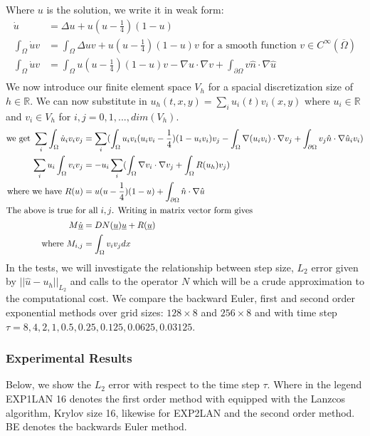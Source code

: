 Where $u$ is the solution, we write it in weak form:
\begin{align*}
    \dot u&=\Delta u+u(u-\frac14)(1-u)\\
    \int_{\Omega} \dot u v &=\int_{\Omega} \Delta uv+u(u-\frac14)(1-u)v \text{ for a smooth function $v \in C^{\infty}(\overline{\Omega})$}\\
    \int_{\Omega} \dot u v &=\int_{\Omega} u(u-\frac14)(1-u)v - \nabla u \cdot \nabla v + \int_{\partial\Omega}  v\hat n \cdot \nabla \hat u\\
\end{align*}
We now introduce our finite element space $V_h$ for a spacial discretization size of $h \in \mathbb{R}$.
We can now substitute in $u_h(t,x,y) = \sum_i u_i(t) v_i(x,y)$ where $u_i \in \mathbb{R}$ and $v_i \in V_h$ for $i,j = 0,1,...,dim(V_h)$.
\begin{align*}
    \text{we get } \sum_i\int_{\Omega} \dot u_i v_i v_j &=\sum_i(\int_{\Omega} u_iv_i(u_iv_i-\frac14)(1-u_iv_i)v_j - \int_{\Omega}\nabla (u_iv_i) \cdot \nabla v_j + \int_{\partial\Omega}  v_j\hat n \cdot \nabla \hat u_iv_i)\\
    \sum_iu_i\int_{\Omega}v_iv_j &= -u_i\sum_i(\int_{\Omega}\nabla v_i \cdot \nabla v_j + \int_{\Omega}R(u_h)v_j)\\
    \text{where we have } R(u)&=u(u-\frac14)(1-u) + \int_{\partial\Omega}  \hat n \cdot \nabla \hat  u\\
    \intertext{The above is true for all $i,j$. Writing in matrix vector form gives}
    M \underline{\dot u} &= DN(\underline{u})\underline{u} + R(\underline{u})\\
    \text{where } M_{i,j} &= \int_{\Omega}v_iv_jdx
\end{align*}
In the tests, we will investigate the relationship between step size, $L_2$ error given by $||\hat u - u_h||_{L_2}$ and calls to the operator $N$ which will be a crude approximation to the computational cost.
We compare the backward Euler, first and second order exponential methods over grid sizes: $128 \times 8$ and $256 \times 8$ and with time step $\tau=8,4,2,1,0.5,0.25,0.125,0.0625,0.03125$.

\subsubsection{Experimental Results}

Below, we show the $L_2$ error with respect to the time step $\tau$.
Where in the legend EXP1LAN 16 denotes the first order method with equipped with the Lanzcos algorithm, Krylov size 16, likewise for EXP2LAN and the second order method.
BE denotes the backwards Euler method.

